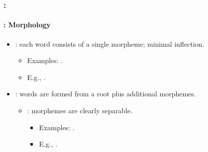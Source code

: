 \documentclass[xcolor=table]{beamer}
\begin{document}
\begin{frame}
	\frametitle{\insertshortsubtitle: \insertsection}
	\framesubtitle{\insertsubsection: Morphology}
%
	
	\begin{itemize}
		\item {}: each word consists of a single morpheme; minimal inflection.
		\begin{itemize}
			\item Examples: .
			\item E.g., .
		\end{itemize}
		
		\item {}: words are formed from a root plus additional morphemes.
		\begin{itemize}
			\item {}: morphemes are clearly separable.
			\begin{itemize}
				\item Examples: .
				\item E.g., .
			\end{itemize}
			

\end{itemize}
\end{itemize}
\end{frame}
\end{document}
